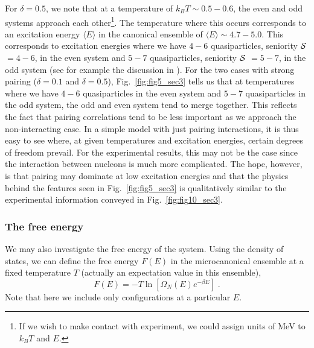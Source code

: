 \documentclass[rmp,aps,floatfix]{revtex4}
\begin{document}
For $\delta=0.5$, we note that at a 
temperature of $k_BT \sim 0.5-0.6$, the even and odd systems
approach each other\footnote{If we wish to make contact with experiment, 
we could assign units of MeV to $k_BT$ and $E$.}. The 
temperature where this occurs corresponds to an excitation energy 
$\langle E\rangle$ in the canonical ensemble of 
$\langle E\rangle \sim 4.7-5.0$. This corresponds to excitation 
energies where we have $4-6$ quasiparticles, 
seniority ${\cal S}$ $=4-6$, in the even system and 
$5-7$ quasiparticles, seniority ${\cal S}$ $=5-7$, in the odd 
system (see for example the discussion in \cite{entropy2000}).
For the two cases 
with strong pairing ($\delta=0.1$ and $\delta=0.5$), 
Fig.\ \ref{fig:fig5_sec3} tells us that at temperatures where we 
have  $4-6$ quasiparticles in the even system and $5-7$  quasiparticles 
in the odd system, the odd and even system tend to merge 
together. This reflects the fact that pairing correlations tend to be less 
important as we approach the non-interacting case.  
In a simple 
model with just pairing interactions, it is thus easy to see where, 
at given temperatures and excitation energies, certain degrees 
of freedom prevail. For the experimental results, 
this may not be the case since the interaction between nucleons is 
much more complicated. The hope, however, is that pairing may dominate 
at low excitation energies and that the physics behind the 
features seen 
in Fig.\ \ref{fig:fig5_sec3} is qualitatively similar to 
the experimental information conveyed in  Fig.\ \ref{fig:fig10_sec3}.



\subsubsection{The free energy}

We may also investigate the free energy of the system.
Using the density of states, we can define
the  free energy $F(E)$ in the microcanonical ensemble 
at a fixed temperature $T$ (actually an expectation value in this ensemble), 
\begin{equation}
    F(E)=-T\ln\left[\Omega_N(E)e^{-\beta E}\right]\;.
    \label{eq:freenergy}
\end{equation}
Note that here we include only
configurations at a particular $E$.
 
\end{document}
